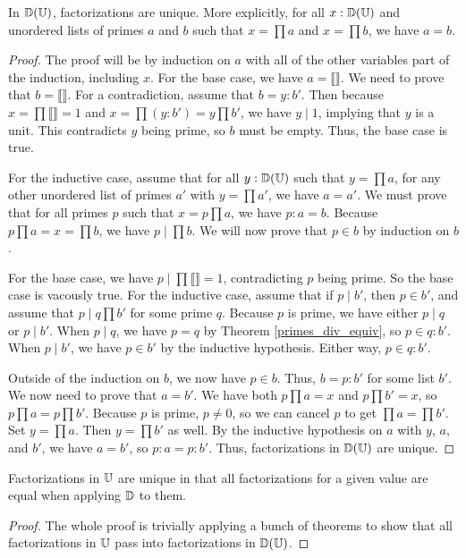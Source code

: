 \documentclass[../../math.tex]{subfiles}
\begin{document}
\begin{theorem} \label{div_factorization_unique}
    In $\mathbb{D}(\mathbb{U})$, factorizations are unique.  More explicitly, for all $x :
    \mathbb{D}(\mathbb{U})$ and unordered lists of primes $a$ and $b$ such that $x = \prod a$
    and $x = \prod b$, we have $a = b$.
\end{theorem}
\begin{proof}
    The proof will be by induction on $a$ with all of the other variables part
    of the induction, including $x$.  For the base case, we have $a = \llbracket
    \rrbracket$.  We need to prove that $b = \llbracket \rrbracket$.  For a
    contradiction, assume that $b = y : b'$.  Then because $x = \prod \llbracket
    \rrbracket = 1$ and $x = \prod (y : b') = y \prod b'$, we have $y \mid 1$,
    implying that $y$ is a unit.  This contradicts $y$ being prime, so $b$ must
    be empty.  Thus, the base case is true.

    For the inductive case, assume that for all $y : \mathbb{D}(\mathbb{U})$ such that $y =
    \prod a$, for any other unordered list of primes $a'$ with $y = \prod a'$,
    we have $a = a'$.  We must prove that for all primes $p$ such that $x = p
    \prod a$, we have $p : a = b$.  Because $p \prod a = x = \prod b$, we have
    $p \mid \prod b$.  We will now prove that $p \in b$ by induction on $b$.

    For the base case, we have $p \mid \prod \llbracket \rrbracket = 1$,
    contradicting $p$ being prime.  So the base case is vacously true.  For the
    inductive case, assume that if $p \mid b'$, then $p \in b'$, and assume that
    $p \mid q \prod b'$ for some prime $q$.  Because $p$ is prime, we have
    either $p \mid q$ or $p \mid b'$.  When $p \mid q$, we have $p = q$ by
    Theorem \ref{primes_div_equiv}, so $p \in q : b'$.  When $p \mid b'$, we
    have $p \in b'$ by the inductive hypothesis.  Either way, $p \in q : b'$.

    Outside of the induction on $b$, we now have $p \in b$.  Thus, $b = p : b'$
    for some list $b'$.  We now need to prove that $a = b'$.
    We have both $p \prod a = x$ and $p \prod b' = x$, so $p \prod a = p \prod
    b'$.  Because $p$ is prime, $p \neq 0$, so we can cancel $p$ to get $\prod a
    = \prod b'$.  Set $y = \prod a$.  Then $y = \prod b'$ as well.  By the
    inductive hypothesis on $a$ with $y$, $a$, and $b'$, we have $a = b'$, so $p
    : a = p : b'$.  Thus, factorizations in $\mathbb{D}(\mathbb{U})$ are unique.
\end{proof}

\begin{theorem} \label{factorization_uni}
    Factorizations in $\mathbb{U}$ are unique in that all factorizations for a given
    value are equal when applying $\mathbb{D}$ to them.
\end{theorem}
\begin{proof}
    The whole proof is trivially applying a bunch of theorems to show that all
    factorizations in $\mathbb{U}$ pass into factorizations in $\mathbb{D}(\mathbb{U})$.
\end{proof}
\end{document}
